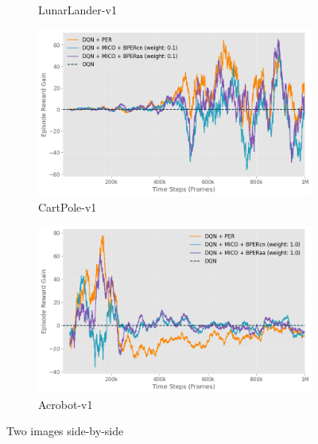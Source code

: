\begin{figure}[h]
\begin{subfigure}{0.45\textwidth}
        \caption{LunarLander-v1}
        \label{fig:lunarlander_reward_gain_vs_dqn}
    \end{subfigure}
    \hfill
    \begin{subfigure}{0.45\textwidth}
        \includegraphics[width=\linewidth]{Results/general_results/cart_polev1_reward_gain_vs_dqn.png}
        \caption{CartPole-v1}
        \label{fig:cart_polev1_reward_gain_vs_dqn}
    \end{subfigure}
    \hfill
    \begin{subfigure}{0.45\textwidth}
        \includegraphics[width=\linewidth]{Results/general_results/acrobotv1_reward_gain_vs_dqn.png}
        \caption{Acrobot-v1}
        \label{fig:acrobotv1_reward_gain_vs_dqn}
    \end{subfigure}
    \caption{Two images side-by-side}
    \label{fig:reward_gain_vs_dqn_methods}
\end{figure}

